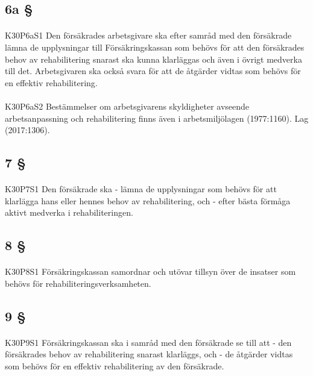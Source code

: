 \documentclass[a4paper,notitlepage,openany,10pt]{book}
\begin{document}
\subsection*{6a §}
\paragraph*{}
{\tiny K30P6aS1}
Den försäkrades arbetsgivare ska efter samråd med den försäkrade lämna de upplysningar till Försäkringskassan som behövs för att den försäkrades behov av rehabilitering snarast ska kunna klarläggas och även i övrigt medverka till det. Arbetsgivaren ska också svara för att de åtgärder vidtas som behövs för en effektiv rehabilitering.
\paragraph*{}
{\tiny K30P6aS2}
Bestämmelser om arbetsgivarens skyldigheter avseende arbetsanpassning och rehabilitering finns även i arbetsmiljölagen (1977:1160).
Lag (2017:1306).
\subsection*{7 §}
\paragraph*{}
{\tiny K30P7S1}
Den försäkrade ska
\newline - lämna de upplysningar som behövs för att klarlägga hans eller hennes behov av rehabilitering, och
\newline - efter bästa förmåga aktivt medverka i rehabiliteringen.
\subsection*{8 §}
\paragraph*{}
{\tiny K30P8S1}
Försäkringskassan samordnar och utövar tillsyn över de insatser som behövs för rehabiliteringsverksamheten.
\subsection*{9 §}
\paragraph*{}
{\tiny K30P9S1}
Försäkringskassan ska i samråd med den försäkrade se till att
\newline - den försäkrades behov av rehabilitering snarast klarläggs, och
\newline - de åtgärder vidtas som behövs för en effektiv rehabilitering av den försäkrade.
\end{document}
